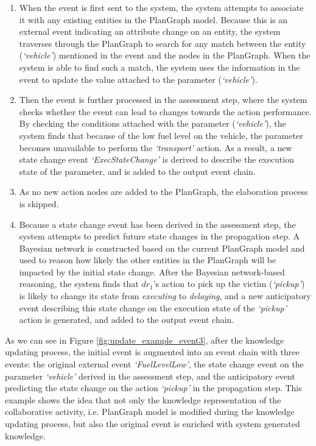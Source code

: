 \begin{enumerate}
	\item When the event is first sent to the system, the system attempts to associate it with any existing entities in the PlanGraph model. Because this is an external event indicating an attribute change on an entity, the system traverses through the PlanGraph to search for any match between the entity (\emph{`vehicle'}) mentioned in the event and the nodes in the PlanGraph. When the system is able to find such a match, the system uses the information in the event to update the value attached to the parameter (\emph{`vehicle'}).
	\item Then the event is further processed in the assessment step, where the system checks whether the event can lead to changes towards the action performance. By checking the conditions attached with the parameter (\emph{`vehicle'}), the system finds that because of the low fuel level on the vehicle, the parameter becomes unavailable to perform the \emph{`transport'} action. As a result, a new state change event \emph{`ExecStateChange'} is derived to describe the execution state of the parameter, and is added to the output event chain.
	\item As no new action nodes are added to the PlanGraph, the elaboration process is skipped.
	\item Because a state change event has been derived in the assessment step, the system attempts to predict future state changes in the propagation step. A Bayesian network is constructed based on the current PlanGraph model and used to reason how likely the other entities in the PlanGraph will be impacted by the initial state change. After the Bayesian network-based reasoning, the system finds that $dr_1$'s action to pick up the victim (\emph{`pickup'}) is likely to change its state from \emph{executing} to \emph{delaying}, and a new anticipatory event describing this state change on the execution state of the \emph{`pickup'} action is generated, and added to the output event chain.
\end{enumerate}

As we can see in Figure \ref{fig:update_example_event3}, after the knowledge updating process, the initial event is augmented into an event chain with three events: the original external event \emph{`FuelLevelLow'}, the state change event on the parameter \emph{`vehicle'} derived in the assessment step, and the anticipatory event predicting the state change on the action \emph{`pickup'} in the propagation step. This example shows the idea that not only the knowledge representation of the collaborative activity, i.e. PlanGraph model is modified during the knowledge updating process, but also the original event is enriched with system generated knowledge.

